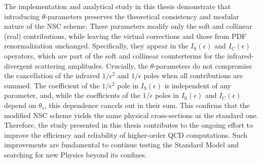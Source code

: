 The implementation and analytical study in this thesis demonstrate that introducing $\theta$-parameters preserves the theoretical consistency and modular nature of the NSC scheme. These parameters modify only the soft and collinear (real) contributions, while leaving the virtual corrections and those from PDF renormalization unchanged. Specifically, they appear in the $I_{\mathrm{S}}(\epsilon)$ and $I_{\mathrm{C}}(\epsilon)$ operators, which are part of the soft and collinear counterterms for the infrared-divergent scattering amplitudes. Crucially, the $\theta$-parameters do not compromise the cancellation of the infrared $1/\epsilon^2$ and $1/\epsilon$ poles when all contributions are summed. The coefficient of the $1/\epsilon^2$ pole in $I_{\mathrm{S}}(\epsilon)$ is independent of any parameter, and, while the coefficients of the $1/\epsilon$ poles in $I_{\mathrm{S}}(\epsilon)$ and $I_{\mathrm{C}}(\epsilon)$ depend on $\theta_s$, this dependence cancels out in their sum. This confirms that the modified NSC scheme yields the same physical cross-sections as the standard one. \\
Therefore, the study presented in this thesis contributes to the ongoing effort to improve the efficiency and reliability of higher-order QCD computations. Such improvements are fundamental to continue testing the Standard Model and searching for new Physics beyond its confines.

